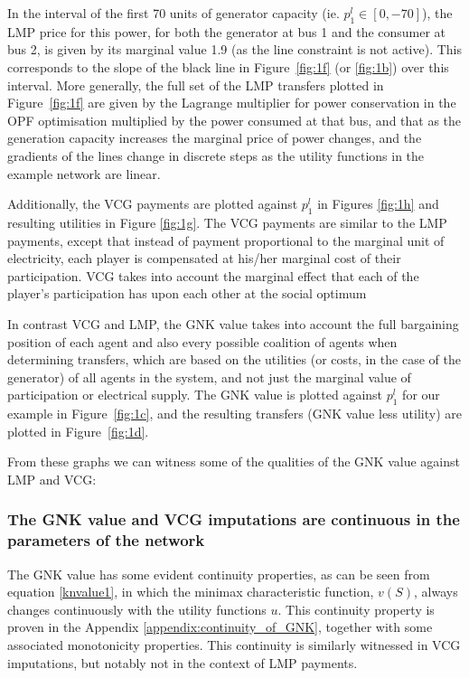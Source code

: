 In the interval of the first 70 units of generator capacity (ie. $p_1^l \in [0,-70]$), the LMP price for this power, for both the generator at bus 1 and the consumer at bus 2, is given by its marginal value 1.9 (as the line constraint is not active). This corresponds to the slope of the black line in Figure~\ref{fig:1f} (or \ref{fig:1b}) over this interval. 
More generally, the full set of the LMP transfers plotted in Figure~\ref{fig:1f} are given by the Lagrange multiplier for power conservation in the OPF optimisation multiplied by the power consumed at that bus, and that as the generation capacity increases the marginal price of power changes, and the gradients of the lines change in discrete steps as the utility functions in the example network are linear.

Additionally, the VCG payments are plotted against $p_1^l$ in Figures \ref{fig:1h} and resulting utilities in Figure \ref{fig:1g}.
The VCG payments are similar to the LMP payments, except that instead of payment proportional to the marginal unit of electricity, each player is compensated at his/her marginal cost of their participation.
VCG takes into account the marginal effect that each of the player's participation has upon each other at the social optimum

In contrast VCG and LMP, the GNK value takes into account the full bargaining position of each agent and also every possible coalition of agents when determining transfers, which are based on the utilities (or costs, in the case of the generator) of all agents in the system, and not just the marginal value of participation or electrical supply.
The GNK value is plotted against $p_1^l$ for our example in Figure~\ref{fig:1c}, and the resulting transfers (GNK value less utility) are plotted in Figure~\ref{fig:1d}.

From these graphs we can witness some of the qualities of the GNK value against LMP and VCG:


\subsubsection*{The GNK value and VCG imputations are continuous in the parameters of the network}
The GNK value has some evident continuity properties, as can be seen from equation \ref{knvalue1}, in which the minimax characteristic function, $v(S)$, always changes continuously with the utility functions $u$.
This continuity property is proven in the Appendix \ref{appendix:continuity_of_GNK}, together with some associated monotonicity properties.
This continuity is similarly witnessed in VCG imputations, but notably not in the context of LMP payments.

